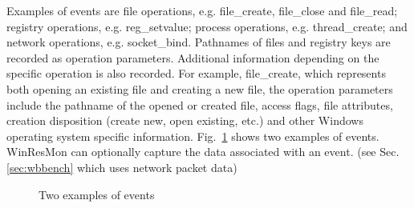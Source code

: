 Examples of events are file operations,
e.g.  file\_create, file\_close and file\_read;
registry operations, e.g. reg\_setvalue;
process operations, e.g.  thread\_create;
and network operations, e.g. socket\_bind.
Pathnames of files and registry keys are recorded as operation parameters.
Additional information depending on the specific operation is also recorded.
For example, file\_create, which represents both opening an existing file
and creating a new file, the operation parameters include the pathname of
the opened or created file, access flags, file attributes, creation disposition
(create new, open existing,
etc.) and other Windows operating system specific information.
Fig.~\ref{fig:logex} shows two examples of events.
WinResMon can optionally capture the data associated with an
event. (see Sec. \ref{sec:wbbench} which uses network packet data)

\begin{figure}
\caption{Two examples of events}
\label{fig:logex}
\end{figure}


